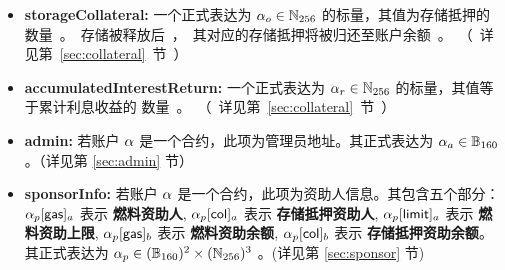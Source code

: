 \begin{itemize}[nosep]
	\item {\bf storageCollateral:} 一个正式表达为 $\mathbf{\alpha}_o\in \mathbb{N}_{256}$ 的标量，其值为存储抵押的 \unit 数量。存储被释放后，其对应的存储抵押将被归还至账户余额。（详见第 \ref{sec:collateral} 节）

	\item {\bf accumulatedInterestReturn:} 一个正式表达为 $\mathbf{\alpha}_r\in \mathbb{N}_{256}$ 的标量，其值等于累计利息收益的 \unit 数量。（详见第 \ref{sec:collateral} 节）

	\item {\bf admin:} 若账户 $\mathbf{\alpha}$ 是一个合约，此项为管理员地址。其正式表达为 $\mathbf{\alpha}_a\in \mathbb{B}_{160}$。（详见第 \ref{sec:admin} 节）

	\item {\bf sponsorInfo:} 若账户 $\mathbf{\alpha}$ 是一个合约，此项为资助人信息。其包含五个部分： $\mathbf{\alpha}_p[{\sf gas}]_a$ 表示 {\bf 燃料资助人}, $\mathbf{\alpha}_p[{\sf col}]_a$ 表示 {\bf 存储抵押资助人}, $\mathbf{\alpha}_p[{\sf limit}]_a$ 表示 {\bf 燃料资助上限}, $\mathbf{\alpha}_p[{\sf gas}]_b$ 表示 {\bf 燃料资助余额}, $\mathbf{\alpha}_p[{\sf col}]_b$ 表示 {\bf 存储抵押资助余额}。
	其正式表达为 $\mathbf{\alpha}_p\in (\mathbb{B}_{160})^2\times (\mathbb{N}_{256})^3$ 。(详见第 \ref{sec:sponsor} 节)
\end{itemize}

